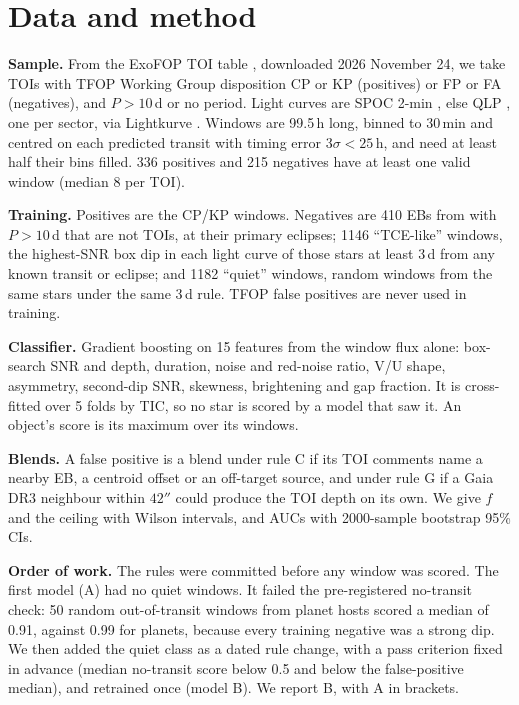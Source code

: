 \documentclass{aastex701}
\begin{document}
\section{Data and method}

\textbf{Sample.} From the ExoFOP TOI table \citep{Guerrero2021}, downloaded 2026 November 24, we take TOIs with TFOP
Working Group disposition CP or KP (positives) or FP or FA (negatives), and $P>10$\,d or no period. Light curves are
SPOC 2-min \citep{Jenkins2016}, else QLP \citep{Huang2020}, one per sector, via Lightkurve
\citep{Lightkurve2018}. Windows are 99.5\,h long, binned to 30\,min and centred on each predicted transit with
timing error $3\sigma<25$\,h, and need at least half their bins filled. 336 positives and 215 negatives have at
least one valid window (median 8 per TOI).

\textbf{Training.} Positives are the CP/KP windows. Negatives are 410 EBs from \citet{Prsa2022} with $P>10$\,d that
are not TOIs, at their primary eclipses; 1146 ``TCE-like'' windows, the highest-SNR box dip in each light curve of
those stars at least 3\,d from any known transit or eclipse; and 1182 ``quiet'' windows, random windows from the
same stars under the same 3\,d rule. TFOP false positives are never used in training.

\textbf{Classifier.} Gradient boosting \citep{Pedregosa2011} on 15 features from the window flux alone: box-search
SNR and depth, duration, noise and red-noise ratio, V/U shape, asymmetry, second-dip SNR, skewness, brightening and
gap fraction. It is cross-fitted over 5 folds by TIC, so no star is scored by a model that saw it. An object's score
is its maximum over its windows.

\textbf{Blends.} A false positive is a blend under rule C if its TOI comments name a nearby EB, a centroid offset or
an off-target source, and under rule G if a Gaia DR3 \citep{Gaia2023} neighbour within $42''$ could produce the TOI
depth on its own. We give $f$ and the ceiling with Wilson intervals, and AUCs with 2000-sample bootstrap 95\% CIs.

\textbf{Order of work.} The rules were committed before any window was scored. The first model (A) had no quiet
windows. It failed the pre-registered no-transit check: 50 random out-of-transit windows from planet hosts scored a
median of 0.91, against 0.99 for planets, because every training negative was a strong dip. We then added the quiet
class as a dated rule change, with a pass criterion fixed in advance (median no-transit score below 0.5 and below the
false-positive median), and retrained once (model B). We report B, with A in brackets.
\end{document}
